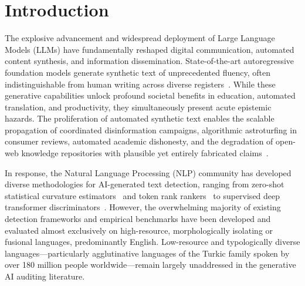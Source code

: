 \section{Introduction}
\label{sec:introduction}

The explosive advancement and widespread deployment of Large Language Models (LLMs) have fundamentally reshaped digital communication, automated content synthesis, and information dissemination. State-of-the-art autoregressive foundation models generate synthetic text of unprecedented fluency, often indistinguishable from human writing across diverse registers~\citep{touvron2023llama,solaiman2019release}. While these generative capabilities unlock profound societal benefits in education, automated translation, and productivity, they simultaneously present acute epistemic hazards. The proliferation of automated synthetic text enables the scalable propagation of coordinated disinformation campaigns, algorithmic astroturfing in consumer reviews, automated academic dishonesty, and the degradation of open-web knowledge repositories with plausible yet entirely fabricated claims~\citep{chakraborty2023possibilities,sadasivan2023can}.

In response, the Natural Language Processing (NLP) community has developed diverse methodologies for AI-generated text detection, ranging from zero-shot statistical curvature estimators~\citep{mitchell2023detectgpt,bao2024fastdetectgpt,hans2024binoculars} and token rank rankers~\citep{gehrmann2019gltr} to supervised deep transformer discriminators~\citep{solaiman2019release,wang2024raid}. However, the overwhelming majority of existing detection frameworks and empirical benchmarks have been developed and evaluated almost exclusively on high-resource, morphologically isolating or fusional languages, predominantly English. Low-resource and typologically diverse languages---particularly agglutinative languages of the Turkic family spoken by over 180 million people worldwide---remain largely unaddressed in the generative AI auditing literature.

